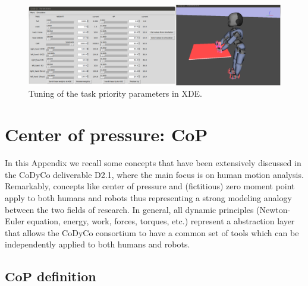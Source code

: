 \documentclass[12pt,a4paper,twoside]{article}
\begin{document}
\begin{figure}[h]
\begin{center}
\includegraphics[width=0.9\hsize]{images/s12.png}
\end{center}
\caption{Tuning of the task priority parameters in XDE.}
\label{fig:params}
\end{figure}




\newpage \appendix

\section{Center of pressure: $\bm {CoP}$}

In this Appendix we recall some concepts that have been extensively discussed in the CoDyCo deliverable D2.1, where the main focus is on human motion analysis. Remarkably, concepts like center of pressure and (fictitious) zero moment point apply to both humans and robots thus representing a strong modeling analogy between the two fields of research. In general, all dynamic principles (Newton-Euler equation, energy, work, forces, torques, etc.) represent a abstraction layer that allows the CoDyCo consortium to have a common set of tools which can be independently applied to both humans and robots. 

\subsection{$\bm{CoP}$ definition}
\end{document}
